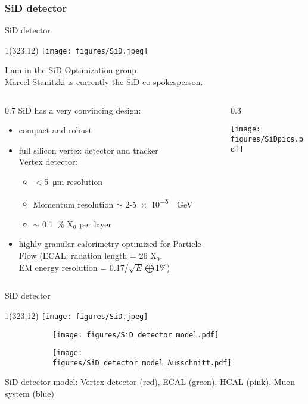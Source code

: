 \documentclass[xcolor={dvipsnames}]{beamer}
\newcommand{\sidlogo}{
  \setlength{\TPHorizModule}{1pt}
  \setlength{\TPVertModule}{1pt}
  \begin{textblock}{1}(323,12)
   \texttt{[image: figures/SiD.jpeg]}
  \end{textblock}
  }
\begin{document}
\subsubsection{SiD detector}
\begin{frame}{SiD detector}
\sidlogo
 I am in the SiD-Optimization group.\\
 Marcel Stanitzki is currently the SiD co-spokesperson.\\
 \vspace*{0.3cm}
 \begin{columns}
  \begin{column}{0.7\textwidth}
    SiD has a very convincing design:
 \begin{itemize}
  \item compact and robust
  \item full silicon vertex detector and tracker
  \\Vertex detector:
  \begin{itemize}
   \item $<$\SI{5}{\micro\metre} resolution
   \item Momentum resolution $\sim$ 2-\SI{5e-5}{\per\giga\electronvolt}
   \item $\sim$ \SI{0.1}{\percent} X$_0$ per layer
  \end{itemize}

  \item highly granular calorimetry optimized for Particle Flow (ECAL: radation length = 26 X$_0$, \\EM energy resolution = 0.17/$\sqrt{E}\bigoplus$1\%)
 \end{itemize}
  \end{column}
  \begin{column}{0.3\textwidth}
    \begin{flushright}
  \texttt{[image: figures/SiDpics.pdf]}
 \end{flushright}
  \end{column}
 \end{columns}
\end{frame}

\begin{frame}{SiD detector}
\sidlogo
\begin{figure}[T]
\centering
\begin{subfigure}[b]{0.49\textwidth}
\centering
\texttt{[image: figures/SiD\_detector\_model.pdf]}
\end{subfigure}
\begin{subfigure}[b]{0.49\textwidth}
\centering
\texttt{[image: figures/SiD\_detector\_model\_Ausschnitt.pdf]}
\end{subfigure}
\end{figure}
{\small SiD detector model: Vertex detector (red), ECAL (green), HCAL (pink), Muon system (blue)}
\end{frame}
\end{document}
